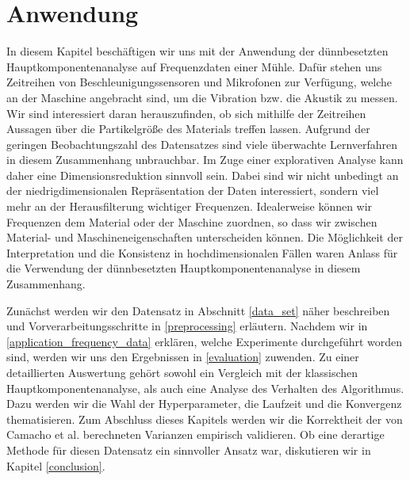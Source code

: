 \chapter{Anwendung}

\label{application}

In diesem Kapitel beschäftigen wir uns mit der Anwendung der dünnbesetzten Hauptkomponentenanalyse auf Frequenzdaten einer Mühle. Dafür stehen uns Zeitreihen von Beschleunigungssensoren und Mikrofonen zur Verfügung, welche an der Maschine angebracht sind, um die Vibration bzw. die Akustik zu messen. Wir sind interessiert daran herauszufinden, ob sich mithilfe der Zeitreihen Aussagen über die Partikelgröße des Materials treffen lassen. Aufgrund der geringen Beobachtungszahl des Datensatzes sind viele überwachte Lernverfahren in diesem Zusammenhang unbrauchbar. Im Zuge einer explorativen Analyse kann daher eine Dimensionsreduktion sinnvoll sein. Dabei sind wir nicht unbedingt an der niedrigdimensionalen Repräsentation der Daten interessiert, sondern viel mehr an der Herausfilterung wichtiger Frequenzen. Idealerweise können wir Frequenzen dem Material oder der Maschine zuordnen, so dass wir zwischen Material- und Maschineneigenschaften unterscheiden können. Die Möglichkeit der Interpretation und die Konsistenz in hochdimensionalen Fällen waren Anlass für die Verwendung der dünnbesetzten Hauptkomponentenanalyse in diesem Zusammenhang. 

Zunächst werden wir den Datensatz in Abschnitt \ref{data_set} näher beschreiben und Vorverarbeitungsschritte in \ref{preprocessing} erläutern. Nachdem wir in \ref{application_frequency_data} erklären, welche Experimente durchgeführt worden sind, werden wir uns den Ergebnissen in \ref{evaluation} zuwenden. Zu einer detaillierten Auswertung gehört sowohl ein Vergleich mit der klassischen Hauptkomponentenanalyse, als auch eine Analyse des Verhalten des Algorithmus. Dazu werden wir die Wahl der Hyperparameter, die Laufzeit und die Konvergenz thematisieren. Zum Abschluss dieses Kapitels werden wir die Korrektheit der von Camacho et al. \cite{camacho} berechneten Varianzen empirisch validieren. Ob eine derartige Methode für diesen Datensatz ein sinnvoller Ansatz war, diskutieren wir in Kapitel \ref{conclusion}.




